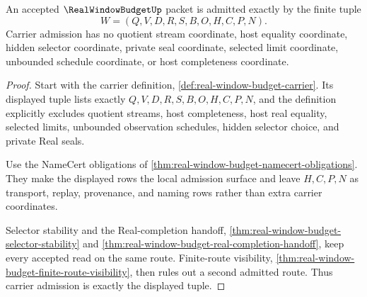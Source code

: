 \begin{theorem}
\label{thm:real-window-budget-carrier-admission-obligation}
An accepted $\RealWindowBudgetUp$ packet is admitted exactly by the finite tuple
$$
W=(Q,V,D,R,S,B,O,H,C,P,N).
$$
Carrier admission has no quotient stream coordinate, host equality coordinate, hidden selector coordinate, private seal coordinate, selected limit coordinate, unbounded schedule coordinate, or host completeness coordinate.
\end{theorem}
\begin{proof}
Start with the carrier definition, \autoref{def:real-window-budget-carrier}. Its displayed tuple lists exactly $Q,V,D,R,S,B,O,H,C,P,N$, and the definition explicitly excludes quotient streams, host completeness, host real equality, selected limits, unbounded observation schedules, hidden selector choice, and private Real seals.

Use the NameCert obligations of \autoref{thm:real-window-budget-namecert-obligations}. They make the displayed rows the local admission surface and leave $H,C,P,N$ as transport, replay, provenance, and naming rows rather than extra carrier coordinates.

Selector stability and the Real-completion handoff, \autoref{thm:real-window-budget-selector-stability} and \autoref{thm:real-window-budget-real-completion-handoff}, keep every accepted read on the same route. Finite-route visibility, \autoref{thm:real-window-budget-finite-route-visibility}, then rules out a second admitted route. Thus carrier admission is exactly the displayed tuple.
\end{proof}

